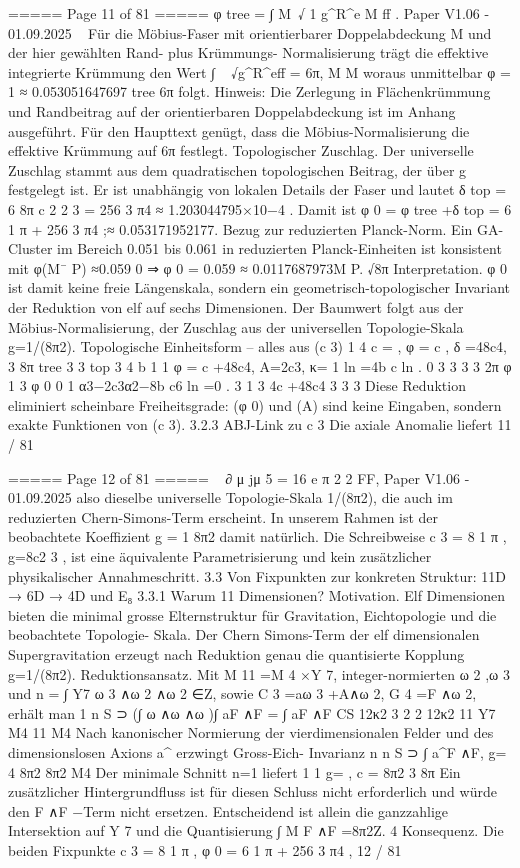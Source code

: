 \begin{MyVerbatim}
===== Page 11 of 81 =====
φ tree = ∫ M~√ 1 g^R^e
M
ff . Paper V1.06 - 01.09.2025
~
Für die Möbius-Faser mit orientierbarer Doppelabdeckung M und der hier gewählten Rand- plus Krümmungs-
Normalisierung trägt die effektive integrierte Krümmung den Wert
∫ ~ √g^R^eff = 6π,
M M
woraus unmittelbar
φ = 1 ≈ 0.053051647697
tree 6π
folgt.
Hinweis: Die Zerlegung in Flächenkrümmung und Randbeitrag auf der orientierbaren Doppelabdeckung ist im Anhang
ausgeführt. Für den Haupttext genügt, dass die Möbius-Normalisierung die effektive Krümmung auf 6π festlegt.
Topologischer Zuschlag.
Der universelle Zuschlag stammt aus dem quadratischen topologischen Beitrag, der über g festgelegt ist. Er ist
unabhängig von lokalen Details der Faser und lautet
δ top = 6 8π c 2 2 3 = 256 3 π4 ≈ 1.203044795×10−4 .
Damit ist
φ
0
= φ
tree
+δ
top
=
6
1
π
+
256
3
π4
;≈ 0.053171952177.
Bezug zur reduzierten Planck-Norm.
Ein GA-Cluster im Bereich 0.051 bis 0.061 in reduzierten Planck-Einheiten ist konsistent mit
φ(M¯ P) ≈0.059
0
⇒ φ 0 = 0.059 ≈ 0.0117687973M P.
√8π
Interpretation.
φ 0 ist damit keine freie Längenskala, sondern ein geometrisch-topologischer Invariant der Reduktion von elf auf sechs
Dimensionen. Der Baumwert folgt aus der Möbius-Normalisierung, der Zuschlag aus der universellen Topologie-Skala
g=1/(8π2).
Topologische Einheitsform – alles aus (c 3)
1 4
c = , φ = c , δ =48c4,
3 8π tree 3 3 top 3
4 b 1 1
φ = c +48c4, A=2c3, κ= 1 ln =4b c ln .
0 3 3 3 3 2π φ 1 3 φ
0 0
1
α3−2c3α2−8b c6 ln =0 .
3 1 3 4c +48c4
3 3 3
Diese Reduktion eliminiert scheinbare Freiheitsgrade: (φ 0) und (A) sind keine Eingaben, sondern exakte Funktionen
von (c 3).
3.2.3 ABJ-Link zu c 3
Die axiale Anomalie liefert
11 / 81

===== Page 12 of 81 =====
~
∂
μ
jμ
5
=
16
e
π
2
2
FF,
Paper V1.06 - 01.09.2025
also dieselbe universelle Topologie-Skala 1/(8π2), die auch im reduzierten Chern-Simons-Term erscheint. In unserem
Rahmen ist der beobachtete Koeffizient
g = 1
8π2
damit natürlich. Die Schreibweise
c 3 = 8 1 π , g=8c2 3 ,
ist eine äquivalente Parametrisierung und kein zusätzlicher physikalischer Annahmeschritt.
3.3 Von Fixpunkten zur konkreten Struktur: 11D → 6D → 4D und E₈
3.3.1 Warum 11 Dimensionen?
Motivation.
Elf Dimensionen bieten die minimal grosse Elternstruktur für Gravitation, Eichtopologie und die beobachtete Topologie-
Skala. Der Chern Simons-Term der elf dimensionalen Supergravitation erzeugt nach Reduktion genau die quantisierte
Kopplung g=1/(8π2).
Reduktionsansatz.
Mit M 11 =M 4 ×Y 7, integer-normierten ω 2 ,ω 3 und
n = ∫
Y7
ω
3
∧ω
2
∧ω
2
∈Z,
sowie
C 3 =aω 3 +A∧ω 2,
G 4 =F ∧ω 2,
erhält man
1 n
S ⊃ (∫ ω ∧ω ∧ω )∫ aF ∧F = ∫ aF ∧F
CS 12κ2 3 2 2 12κ2
11 Y7 M4 11 M4
Nach kanonischer Normierung der vierdimensionalen Felder und des dimensionslosen Axions a^ erzwingt Gross-Eich-
Invarianz
n n
S ⊃ ∫ a^F ∧F, g=
4 8π2 8π2
M4
Der minimale Schnitt n=1 liefert
1 1
g= , c =
8π2 3 8π
Ein zusätzlicher Hintergrundfluss ist für diesen Schluss nicht erforderlich und würde den F ∧F −Term nicht ersetzen.
Entscheidend ist allein die ganzzahlige Intersektion auf Y 7 und die Quantisierung ∫ M F ∧F =8π2Z.
4
Konsequenz.
Die beiden Fixpunkte
c 3 = 8 1 π ,
φ 0 = 6 1 π + 256 3 π4 ,
12 / 81


\end{MyVerbatim}
